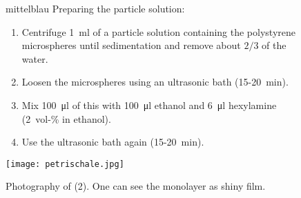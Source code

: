 \setcounter{figure}{4}
\begin{figure}[htbp]
\begin{minipage}[t][][t]{0.68\textwidth}
    \large
    \begin{color}{mittelblau}
        Preparing the particle solution: \cite{manual}
    \end{color}
    \normalsize
    \begin{enumerate}
        \item Centrifuge \SI{1}{\milli\litre} of a particle solution containing the polystyrene microspheres until sedimentation and remove about $2/3$ of the water.
        \item Loosen the microspheres using an ultrasonic bath (15-\SI{20}{\minute}).
        \item Mix \SI{100}{\micro\litre} of this with \SI{100}{\micro\litre} ethanol and \SI{6}{\micro\litre} hexylamine (\SI{2}{vol}-\si{\percent} in ethanol).
        \item Use the ultrasonic bath again (15-\SI{20}{\minute}).
    \end{enumerate}
\end{minipage}
\hfill
\begin{minipage}[t][][b]{0.28\textwidth}
    \texttt{[image: petrischale.jpg]}
    \caption{Photography of (2).
        One can see the monolayer as shiny film. \cite{manual}}
\end{minipage}
\end{figure}